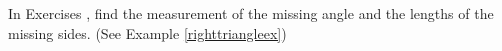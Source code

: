 {\noindent In Exercises}
{, find the measurement of the missing angle and the lengths of the missing sides.  (See Example \ref{righttriangleex})}
